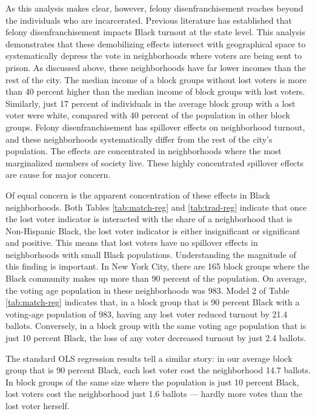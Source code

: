 \documentclass[]{article}
\begin{document}
As this analysis makes clear, however, felony disenfranchisement reaches beyond the individuals who are incarcerated. Previous literature has established that felony disenfranchisement impacts Black turnout at the state level. This analysis demonstrates that these demobilizing effects intersect with geographical space to systematically depress the vote in neighborhoods where voters are being sent to prison. As discussed above, these neighborhoods have far lower incomes than the rest of the city. The median income of a block groups without lost voters is more than 40 percent higher than the median income of block groups with lost voters. Similarly, just 17 percent of individuals in the average block group with a lost voter were white, compared with 40 percent of the population in other block groups. Felony disenfranchisement has spillover effects on neighborhood turnout, and these neighborhoods systematically differ from the rest of the city's population. The effects are concentrated in neighborhoods where the most marginalized members of society live. These highly concentrated spillover effects are cause for major concern.

Of equal concern is the apparent concentration of these effects in Black neighborhoods. Both Tables \ref{tab:match-reg} and \ref{tab:trad-reg} indicate that once the lost voter indicator is interacted with the share of a neighborhood that is Non-Hispanic Black, the lost voter indicator is either insignificant or significant and positive. This means that lost voters have no spillover effects in neighborhoods with small Black populations. Understanding the magnitude of this finding is important. In New York City, there are 165 block groups where the Black community makes up more than 90 percent of the population. On average, the voting age population in these neighborhoods was 983. Model 2 of Table \ref{tab:match-reg} indicates that, in a block group that is 90 percent Black with a voting-age population of 983, having any lost voter reduced turnout by 21.4 ballots. Conversely, in a block group with the same voting age population that is just 10 percent Black, the loss of any voter decreased turnout by just 2.4 ballots.

The standard OLS regression results tell a similar story: in our average block group that is 90 percent Black, each lost voter cost the neighborhood 14.7 ballots. In block groups of the same size where the population is just 10 percent Black, lost voters cost the neighborhood just 1.6 ballots --- hardly more votes than the lost voter herself.
\end{document}

